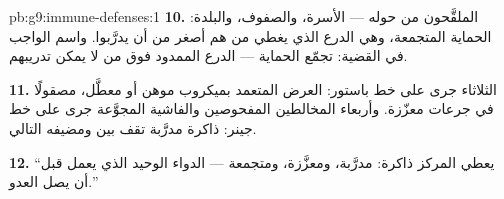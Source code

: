 \begin{solution}{pb:g9:immune-defenses:1}
\textbf{10.} الملقَّحون من حوله --- الأسرة، والصفوف،
والبلدة: الحماية المتجمعة، وهي الدرع الذي يغطي من هم
أصغر من أن يدرَّبوا. واسم الواجب في القضية: تجمّع
الحماية --- الدرع الممدود فوق من لا يمكن تدريبهم.

\textbf{11.} الثلاثاء جرى على خط باستور: العرض المتعمد
بميكروب موهن أو معطَّل، مصقولًا في جرعات معزّزة.
وأربعاء المخالطين المفحوصين والفاشية المجوَّعة جرى على
خط جينر: ذاكرة مدرَّبة تقف بين  ومضيفه التالي.

\textbf{12.} ``يعطي المركز ذاكرة: مدرَّبة، ومعزَّزة،
ومتجمعة --- الدواء الوحيد الذي يعمل قبل أن يصل العدو.''
\end{solution}
